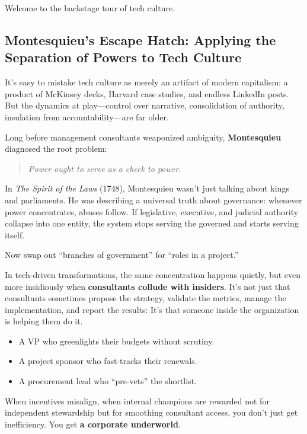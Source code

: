 Welcome to the backstage tour of tech culture.


\subsection{Montesquieu’s Escape Hatch: Applying the Separation of Powers to Tech Culture}

It’s easy to mistake tech culture as merely an artifact of modern capitalism: a product of McKinsey decks, Harvard case studies, and endless LinkedIn posts. But the dynamics at play—control over narrative, consolidation of authority, insulation from accountability—are far older.

Long before management consultants weaponized ambiguity, \textbf{Montesquieu} diagnosed the root problem:

\begin{quote}
\textit{Power ought to serve as a check to power.}
\end{quote}

In \textit{The Spirit of the Laws} (1748), Montesquieu wasn’t just talking about kings and parliaments. He was describing a universal truth about governance: whenever power concentrates, abuses follow. If legislative, executive, and judicial authority collapse into one entity, the system stops serving the governed and starts serving itself.

Now swap out “branches of government” for “roles in a project.”

In tech-driven transformations, the same concentration happens quietly, but even more insidiously when \textbf{consultants collude with insiders}.  
It’s not just that consultants sometimes propose the strategy, validate the metrics, manage the implementation, and report the results:  
It’s that someone inside the organization is helping them do it.  

\begin{itemize}
  \item A VP who greenlights their budgets without scrutiny.  
  \item A project sponsor who fast-tracks their renewals.  
  \item A procurement lead who “pre-vets” the shortlist.  
\end{itemize}

When incentives misalign, when internal champions are rewarded not for independent stewardship but for smoothing consultant access, you don’t just get inefficiency. You get \textbf{a corporate underworld}.  

